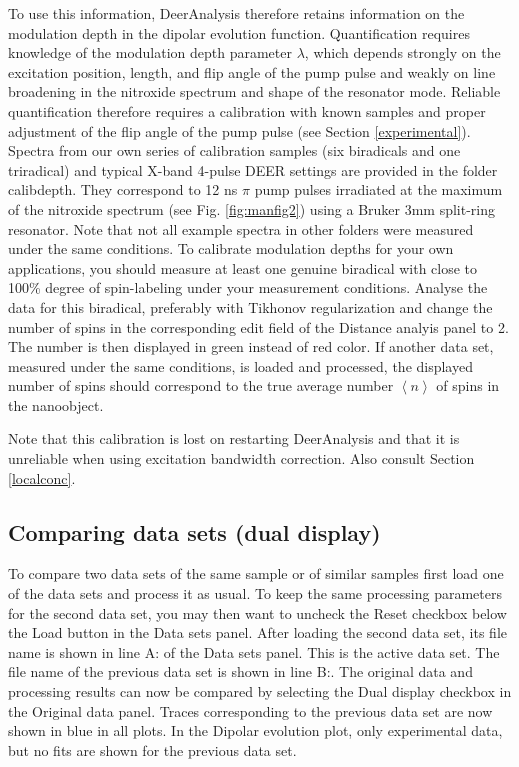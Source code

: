 \documentclass{article}
\begin{document}
To use this information, DeerAnalysis
therefore retains information on the modulation depth in the dipolar evolution function. Quantification requires knowledge of the modulation depth parameter $\lambda$, which depends strongly on the excitation position, length, and flip angle of the pump pulse and weakly on line broadening
in the nitroxide spectrum and shape of the resonator mode. Reliable
quantification therefore requires a calibration with known samples and proper
adjustment of the flip angle of the pump pulse (see Section \ref{experimental}). Spectra from our own
series of calibration samples (six biradicals and one triradical) and typical X-band 4-pulse DEER settings are provided in
the folder {\ttfamily calibdepth}. They correspond to 12 ns $\pi$ pump pulses irradiated at the
maximum of the nitroxide spectrum (see Fig. \ref{fig:manfig2}) using a Bruker 3mm split-ring
resonator. Note that not all example spectra in other folders were measured
under the same conditions. To calibrate modulation depths for your own applications,
you should measure at least one genuine biradical with close to 100\%
degree of spin-labeling under your measurement conditions. Analyse the data for this biradical, preferably with Tikhonov regularization and change the number of spins in the corresponding edit field of the {\ttfamily Distance analyis} panel to 2. The number is then displayed in green instead of red color. If another data set, measured under the same conditions, is loaded and processed, the displayed number of spins should correspond to the true average number $\left\langle n \right\rangle$ of spins in the nanoobject.

Note that this calibration is lost on restarting DeerAnalysis and that it is unreliable when using excitation bandwidth correction. Also consult Section \ref{localconc}.

\subsection{Comparing data sets (dual display)}
\label{dual_display}
To compare two data sets of the same sample or of similar samples first load one of the data sets and process it as usual. To keep the same processing parameters for the second data set, you may then want to uncheck the {\ttfamily Reset} checkbox below the {\ttfamily Load} button in the {\ttfamily Data sets} panel. After loading the second data set, its file name is shown in line {\ttfamily A:} of the {\ttfamily Data sets} panel. This is the active data set. The file name of the previous data set is shown in line {\ttfamily B:}. The original data and processing results can now be compared by selecting the {\ttfamily Dual display} checkbox in the {\ttfamily Original data} panel. Traces corresponding to the previous data set are now shown in blue in all plots. In the {\ttfamily Dipolar evolution} plot, only experimental data, but no fits are shown for the previous data set.
\end{document}
